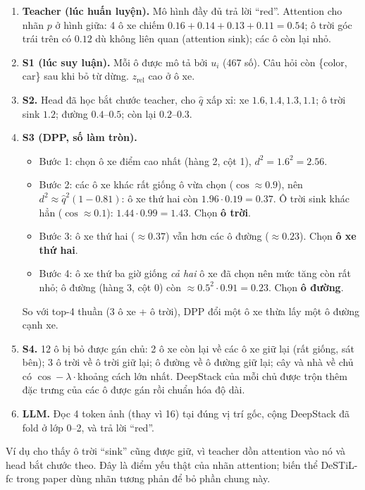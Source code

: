 \documentclass[11pt,a4paper]{article}
\newcommand{\qhat}{\hat{q}}
\begin{document}
\begin{enumerate}[leftmargin=*]
\item \textbf{Teacher (lúc huấn luyện).} Mô hình đầy đủ trả lời ``red''. Attention cho nhãn $p$ ở hình giữa: 4 ô xe chiếm $0.16+0.14+0.13+0.11=0.54$; ô trời góc trái trên có $0.12$ dù không liên quan (attention sink); các ô còn lại nhỏ.
\item \textbf{S1 (lúc suy luận).} Mỗi ô được mô tả bởi $u_i$ (467 số). Câu hỏi còn \{color, car\} sau khi bỏ từ dừng. $z_\text{rel}$ cao ở ô xe.
\item \textbf{S2.} Head đã học bắt chước teacher, cho $\qhat$ xấp xỉ: xe $1.6,1.4,1.3,1.1$; ô trời sink $1.2$; đường $0.4$--$0.5$; còn lại $0.2$--$0.3$.
\item \textbf{S3 (DPP, số làm tròn).}
  \begin{itemize}
  \item Bước 1: chọn ô xe điểm cao nhất (hàng 2, cột 1), $d^2=1.6^2=2.56$.
  \item Bước 2: các ô xe khác rất giống ô vừa chọn ($\cos\approx0.9$), nên $d^2\approx\qhat^2(1-0.81)$: ô xe thứ hai còn $1.96\cdot0.19=0.37$. Ô trời sink khác hẳn ($\cos\approx0.1$): $1.44\cdot0.99=1.43$. Chọn \textbf{ô trời}.
  \item Bước 3: ô xe thứ hai ($\approx0.37$) vẫn hơn các ô đường ($\approx0.23$). Chọn \textbf{ô xe thứ hai}.
  \item Bước 4: ô xe thứ ba giờ giống \emph{cả hai} ô xe đã chọn nên mức tăng còn rất nhỏ; ô đường (hàng 3, cột 0) còn $\approx0.5^2\cdot0.91=0.23$. Chọn \textbf{ô đường}.
  \end{itemize}
  So với top-4 thuần (3 ô xe + ô trời), DPP đổi một ô xe thừa lấy một ô đường cạnh xe.
\item \textbf{S4.} 12 ô bị bỏ được gán chủ: 2 ô xe còn lại về các ô xe giữ lại (rất giống, sát bên); 3 ô trời về ô trời giữ lại; ô đường về ô đường giữ lại; cây và nhà về chủ có $\cos-\lambda\cdot$khoảng cách lớn nhất. DeepStack của mỗi chủ được trộn thêm đặc trưng của các ô được gán rồi chuẩn hóa độ dài.
\item \textbf{LLM.} Đọc 4 token ảnh (thay vì 16) tại đúng vị trí gốc, cộng DeepStack đã fold ở lớp 0--2, và trả lời ``red''.
\end{enumerate}

\begin{luuy}
Ví dụ cho thấy ô trời ``sink'' cũng được giữ, vì teacher dồn attention vào nó và head bắt chước theo. Đây là điểm yếu thật của nhãn attention; biến thể DeSTiL-fc trong paper dùng nhãn tương phản để bỏ phần chung này.
\end{luuy}
\end{document}
